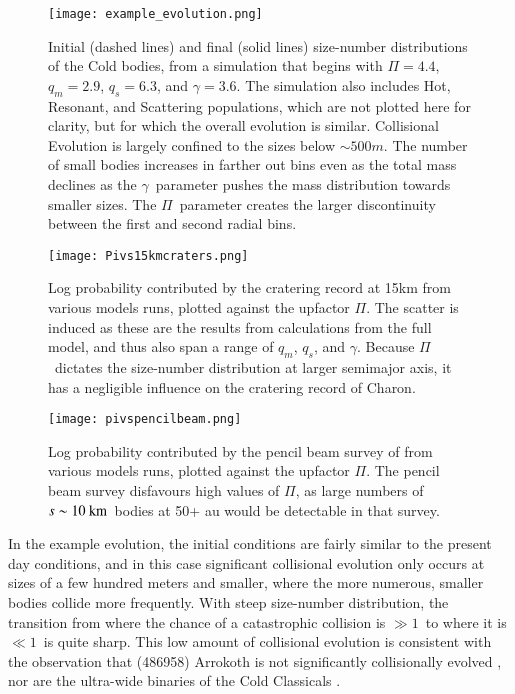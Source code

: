 \documentclass[printer]{aa}
\newcommand{\revised}{\color{black}}
\begin{document}
{\begin{figure}
  \texttt{[image: example\_evolution.png]}
  \caption{Initial (dashed lines) and final (solid lines) size-number distributions of the Cold bodies, from a simulation that begins with $\Pi = 4.4$, $q_m = 2.9$, $q_s = 6.3$, and $\gamma = 3.6$.  The simulation also includes Hot, Resonant, and Scattering populations, which are not plotted here for clarity, but for which the overall evolution is similar.  {\revised Collisional Evolution is largely confined to the sizes below $\sim 500 m$.  The number of small bodies increases in farther out bins even as the total mass declines as the $\gamma$~parameter pushes the mass distribution towards smaller sizes.  The $\Pi$~parameter creates the larger discontinuity between the first and second radial bins.}}
  \label{fig:example_colds}
\end{figure}

\begin{figure}
  \texttt{[image: Pivs15kmcraters.png]}
  \caption{Log probability contributed by the cratering record at 15km from various models runs, plotted against the upfactor $\Pi$.  The scatter is induced as these are the results from calculations from the full model, and thus also span a range of $q_m$, $q_s$, and $\gamma$.  Because $\Pi$~dictates the size-number distribution at larger semimajor axis, it has a negligible influence on the cratering record of Charon.}
  \label{fig:upfactorversuscraters}
\end{figure}

\begin{figure}
  \texttt{[image: pivspencilbeam.png]}
  \caption{Log probability contributed by the pencil beam survey of \citet{2004AJ....128.1364B} from various models runs, plotted against the upfactor $\Pi$.  The pencil beam survey disfavours high values of $\Pi$, as large numbers of $s \sim 10~\rm{km}$~bodies at 50+ au would be detectable in that survey.}
  \label{fig:pivscraters}
\end{figure}

In the example evolution, the initial conditions are fairly similar to the present day conditions, {\revised and in this case} significant collisional evolution only occurs at sizes of a few hundred meters and smaller, {\revised where the more numerous, smaller bodies collide more frequently.  With  steep size-number distribution, the transition from where the chance of a catastrophic collision is $ \gg 1$~to where it is $ \ll 1$~is quite sharp}.  This low amount of collisional evolution is consistent with the observation that (486958) Arrokoth is not significantly collisionally evolved \citep{2020Sci...367.3999S}, nor are the ultra-wide binaries of the Cold Classicals \citep{2012ApJ...744..139P}.  

}
\end{document}
